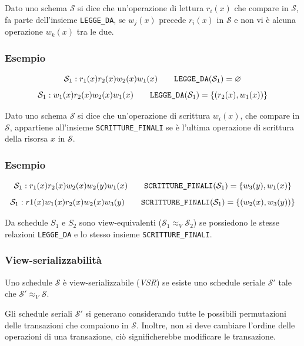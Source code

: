 \documentclass[oneside,a4paper,11pt]{book}
\theoremstyle{italicstyle}
\theoremstyle{normStyle}
\begin{document}
\begin{tcolorbox}[title = {Legge da}]
Dato uno schema $\mathcal{S}$ si dice che un'operazione di lettura $r_i(x)$ che compare in $\mathcal{S}$,
fa parte dell'insieme \verb|LEGGE_DA|, se $w_j(x)$ precede $r_i(x)$ in $\mathcal{S}$
e non vi è alcuna operazione $w_k(x)$ tra le due.
\end{tcolorbox}
\subsubsection{Esempio}
\[
  \mathcal{S}_1:r_1(x)r_2(x)w_2(x)w_1(x)\qquad\verb|LEGGE_DA|(\mathcal{S}_1)=\varnothing
\]
\[
  \mathcal{S}_1:w_1(x)r_2(x)w_2(x)w_1(x)\qquad\verb|LEGGE_DA|(\mathcal{S}_1)=\{(r_2(x),w_1(x))\}
\]

\begin{tcolorbox}[title = {Scritture finali}]
  Dato uno schema $\mathcal{S}$ si dice che un'operazione di scrittura $w_i(x)$,
  che compare in $\mathcal{S}$, appartiene all'insieme \verb|SCRITTURE_FINALI| se è l'ultima operazione di scrittura della risorsa $x$
  in $\mathcal{S}$.
  \end{tcolorbox}
  \subsubsection{Esempio}
  \[
    \mathcal{S}_1:r_1(x)r_2(x)w_2(x)w_2(y)w_1(x)\qquad\verb|SCRITTURE_FINALI|(\mathcal{S}_1)=\{w_3(y),w_1(x)\}
  \]
  \[
    \mathcal{S}_1:r1(x)w_1(x)r_2(x)w_2(x)w_3(y)\qquad\verb|SCRITTURE_FINALI|(\mathcal{S}_1)=\{(w_2(x),w_3(y))\}
  \]

\begin{tcolorbox}[title = {View-equivalenza}]
  Da schedule $S_1$ e $S_2$ sono view-equivalenti ($\mathcal{S}_1 \approx_V \mathcal{S}_2$) se 
  possiedono le stesse relazioni \verb|LEGGE_DA| e lo stesso insieme \verb|SCRITTURE_FINALI|.
\end{tcolorbox}
\subsubsection{View-serializzabilità}
\begin{tcolorbox}[title = {View-serializzabilità}]
Uno schedule $\mathcal{S}$ è view-serializzabile (\textit{VSR}) se esiste uno schedule 
seriale $\mathcal{S}'$ tale che $\mathcal{S}' \approx_V \mathcal{S}$.
\end{tcolorbox}
Gli schedule seriali $\mathcal{S}'$ si generano considerando tutte le possibili 
permutazioni delle transazioni che compaiono in $\mathcal{S}$. Inoltre, non si deve 
cambiare l'ordine delle operazioni di una transazione, ciò significherebbe modificare le transazione.
\end{document}
